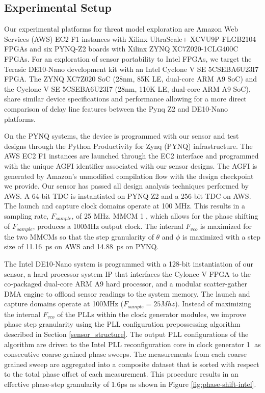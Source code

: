 \subsection{Experimental Setup}
\label{sensor_config}

Our experimental platforms for threat model exploration are Amazon Web Services (AWS) EC2 F1 instances with Xilinx UltraScale+ XCVU9P-FLGB2104 FPGAs and six PYNQ-Z2 boards with Xilinx ZYNQ XC7Z020-1CLG400C FPGAs. For an exploration of sensor portability to Intel FPGAs, we target the Terasic DE10-Nano development kit with an Intel Cyclone V SE 5CSEBA6U23I7 FPGA. The ZYNQ XC7Z020 SoC (28nm, 85K LE, dual-core ARM A9 SoC) and the Cyclone V SE 5CSEBA6U23I7 (28nm, 110K LE, dual-core ARM A9 SoC), share similar device specifications and performance allowing for a more direct comparison of delay line features between the Pynq Z2 and DE10-Nano platforms.

On the PYNQ systems, the device is programmed with our sensor and test designs through the Python Productivity for Zynq (PYNQ) infrastructure. The AWS EC2 F1 instances are launched through the EC2 interface and programmed with the unique AGFI identifier associated with our sensor designs. The AGFI is generated by Amazon's unmodified compilation flow with the design checkpoint we provide. Our sensor has passed all design analysis techniques performed by AWS. A 64-bit \name TDC is instantiated on PYNQ-Z2 and a 256-bit \name TDC on AWS. The launch and capture clock domains operate at 100 MHz. This results in a sampling rate, $F_{sample}$, of 25 MHz. MMCM \textcircled{1}, which allows for the phase shifting of $F_{sample}$, produces a 100MHz output clock. The internal $F_{vco}$ is maximized for the two MMCMs so that the step granularity of $\theta$ and $\phi$ is maximized with a step size of 11.16~ps on AWS and 14.88~ps on PYNQ. 

The Intel DE10-Nano system is programmed with a 128-bit instantiation of our sensor, a hard processor system IP that interfaces the Cylonce V FPGA to the co-packaged dual-core ARM A9 hard processor, and a modular scatter-gather DMA engine to offload sensor readings to the system memory. The launch and capture domains operate at 100MHz ($F_{sample}=25Mhz$). Instead of maximizing the internal $F_{vco}$ of the PLLs within the clock generator modules, we improve phase step granularity using the PLL configuration prepossessing algorithm described in Section \ref{sensor_structure}. The output PLL configurations of the algorithm are driven to the Intel PLL reconfiguration core in clock generator \textcircled{1} as consecutive coarse-grained phase sweeps. The measurements from each coarse grained sweep are aggregated into a composite dataset that is sorted with respect to the total phase offset of each measurement. This procedure results in an effective phase-step granularity of 1.6ps as shown in Figure \ref{fig:phase-shift-intel}.

